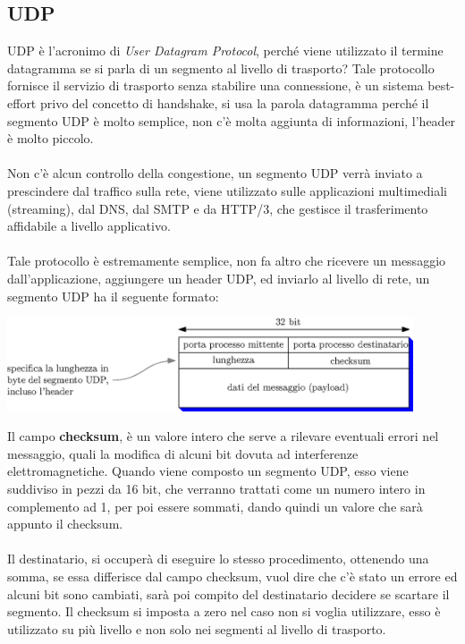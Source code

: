 \documentclass[12pt, letterpaper]{article}
\newcommand{\acc}{\\\hphantom{}\\}
\begin{document}
\subsection{UDP}
UDP è l'acronimo di \textit{User Datagram Protocol}, perché viene utilizzato il termine datagramma se si 
parla di un segmento al livello di trasporto? Tale protocollo fornisce il servizio di trasporto senza 
stabilire una connessione, è un sistema best-effort privo del concetto di handshake, si usa la parola datagramma 
perché il segmento UDP è molto semplice, non c'è molta aggiunta di informazioni, l'header è molto piccolo. 
\acc 
Non c'è alcun controllo della congestione, un segmento UDP verrà inviato a prescindere dal traffico sulla 
rete, viene utilizzato sulle applicazioni multimediali (streaming), dal DNS, dal SMTP e da HTTP/3, che 
gestisce il trasferimento affidabile a livello applicativo. \acc 
Tale protocollo è estremamente semplice, non fa altro che ricevere un messaggio dall'applicazione, aggiungere 
un header UDP, ed inviarlo al livello di rete, un segmento UDP ha il seguente formato:\begin{center}
    \includegraphics[width=0.9\textwidth ]{images/segmentoUDP.eps}
\end{center}
Il campo \textbf{checksum}, è un valore intero che serve a rilevare eventuali errori nel messaggio, quali 
la modifica di alcuni bit dovuta ad interferenze elettromagnetiche. Quando viene composto un 
segmento UDP, esso viene suddiviso in pezzi da 16 bit, che verranno trattati come un numero  
intero in complemento ad 1, per poi essere sommati, dando quindi un valore che sarà appunto 
il checksum.\acc 
Il destinatario, si occuperà di eseguire lo stesso procedimento, ottenendo una somma, se essa differisce 
dal campo checksum, vuol dire che c'è stato un errore ed alcuni bit sono cambiati, sarà poi compito 
del destinatario decidere se scartare il segmento. Il checksum si imposta a zero nel caso non 
si voglia utilizzare, esso è utilizzato su più livello e non solo nei segmenti al livello di trasporto.
\end{document}
